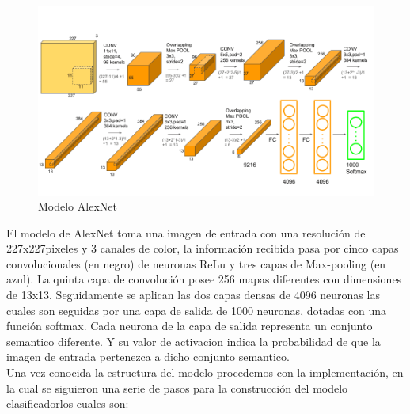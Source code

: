 				\begin{figure}[ht]
					\centering
					\includegraphics[scale=0.4]{Figs/5.png}
					\caption{Modelo AlexNet}
					\label{fig:AlexNet}
				\end{figure}
				\newpage	
				El modelo de AlexNet toma una imagen de entrada con una resolución de 227x227pixeles y 3 canales de color, la información recibida pasa por cinco capas convolucionales (en negro) de neuronas ReLu y tres capas de Max-pooling (en azul). La quinta capa de convolución posee 256 mapas diferentes con dimensiones de 13x13. Seguidamente se aplican las dos capas densas de 4096 neuronas las cuales son seguidas por una capa de salida de 1000 neuronas, dotadas con una función softmax. Cada neurona de la capa de salida representa un conjunto semantico diferente. Y su valor de activacion indica la probabilidad de que la imagen de entrada pertenezca a dicho conjunto semantico.\\
		
				
				Una vez conocida la estructura del modelo procedemos con la implementación, en la cual se siguieron una serie de pasos para la construcción del modelo clasificadorlos cuales son:
				
